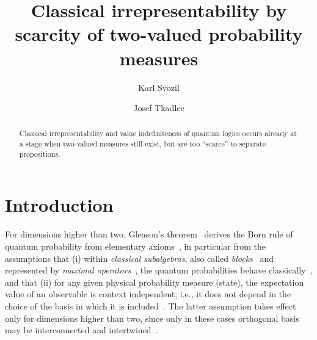 \documentclass[pra,amsfonts,showpacs,showkeys,preprint]{revtex4}%
\begin{document}


\title{Classical irrepresentability by scarcity of two-valued probability measures}

\author{Karl Svozil}

\author{Josef Tkadlec}

\begin{abstract}
Classical irrepresentability and value indefiniteness of quantum logics occurs already at a stage when two-valued measures still exist, but are too ``scarce'' to separate propositions.
\end{abstract}


\maketitle



\section{Introduction}

For dimensions higher than two, Gleason's theorem~\cite{Gleason,r:dvur-93,pitowsky:218} derives the Born rule of quantum probability from elementary axioms~\cite[Section~7-2.]{peres},
in particular from the assumptions  that
(i) within {\em classical subalgebras}, also called {\em blocks}~\cite{greechie:71,nav:91,pulmannova-91}
and represented by {\em maximal operators}~\cite[\S~84]{halmos-vs},
the quantum probabilities  behave classically~\cite{svozil-2008-ql}, and that
(ii) for any given physical probability measure (state), the expectation value of an observable is context independent; i.e.,
it does not depend in the choice of the basis in which it is included~\cite{svozil:040102}.
The latter assumption takes effect only for dimensions higher than two,
since only in these cases orthogonal basis may be interconnected and intertwined~\cite[p.~193]{peres}.
\end{document}
